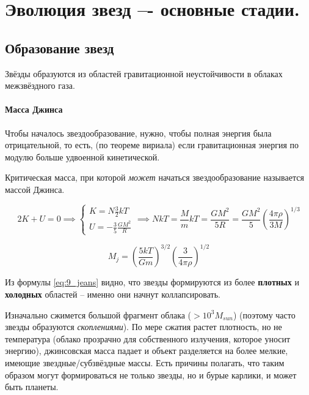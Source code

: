 \section{Эволюция звезд –- основные стадии.}

\subsection{Образование звезд}

Звёзды образуются из областей гравитационной неустойчивости в облаках межзвёздного газа. 

\paragraph{Масса Джинса}

Чтобы началось звездообразование, нужно, чтобы полная энергия была отрицательной, то есть, (по теореме вириала) если гравитационная энергия по модулю больше удвоенной кинетической.

Критическая масса, при которой \textit{может} начаться звездообразование называется массой Джинса.

\begin{equation*}
2 K + U = 0 \implies
 \begin{cases}
   K = N \frac{3}{2} k T\\
   U = - \frac{3}{5}\frac{GM^2}{R}
 \end{cases} \implies
 N k T = \frac{M}{m} k T = \frac{GM^2}{5R} = \frac{GM^2}{5}\left(\frac{4\pi\rho}{3 M}\right)^{1/3}
\end{equation*}

\begin{equation}
   \boxed{ M_j = \left(\frac{5 k T}{Gm} \right)^{3/2} \left(\frac{3}{4\pi\rho} \right)^{1/2}}
   \label{eq:9_jeans}
\end{equation}

Из формулы \ref{eq:9_jeans} видно, что звезды формируются из более \textbf{плотных} и \textbf{холодных} областей -- именно они начнут коллапсировать. 

Изначально сжимется большой фрагмент облака ($> 10^3 M_{sun}$) (поэтому часто звезды образуются \textit{скоплениями}). По мере сжатия растет плотность, но не температура (облако прозрачно для собственного излучения, которое уносит энергию), джинсовская масса падает и объект разделяется на более мелкие, имеющие звездные/субзвёздные массы. Есть причины полагать, что таким образом могут формироваться не только звезды, но и бурые карлики, и может быть планеты.

